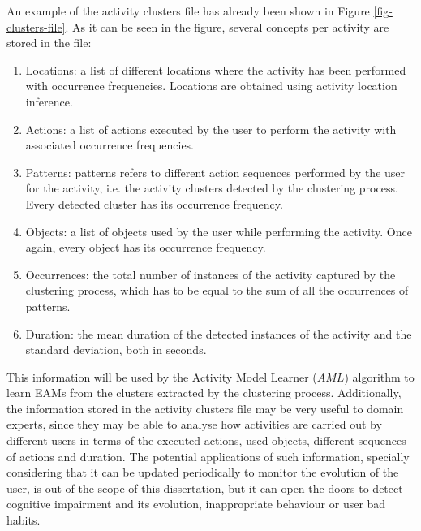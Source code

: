 An example of the activity clusters file has already been shown in Figure \ref{fig-clusters-file}. As it can be seen in the figure, several concepts per activity are stored in the file:

\begin{enumerate}
 \item Locations: a list of different locations where the activity has been performed with occurrence frequencies. Locations are obtained using activity location inference.
 \item Actions: a list of actions executed by the user to perform the activity with associated occurrence frequencies.
 \item Patterns: patterns refers to different action sequences performed by the user for the activity, i.e. the activity clusters detected by the clustering process. Every detected cluster has its occurrence frequency. 
 \item Objects: a list of objects used by the user while performing the activity. Once again, every object has its occurrence frequency.
 \item Occurrences: the total number of instances of the activity captured by the clustering process, which has to be equal to the sum of all the occurrences of patterns. 
 \item Duration: the mean duration of the detected instances of the activity and the standard deviation, both in seconds.
\end{enumerate}

This information will be used by the Activity Model Learner ($AML$) algorithm to learn EAMs from the clusters extracted by the clustering process. Additionally, the information stored in the activity clusters file may be very useful to domain experts, since they may be able to analyse how activities are carried out by different users in terms of the executed actions, used objects, different sequences of actions and duration. The potential applications of such information, specially considering that it can be updated periodically to monitor the evolution of the user, is out of the scope of this dissertation, but it can open the doors to detect cognitive impairment and its evolution, inappropriate behaviour or user bad habits. 